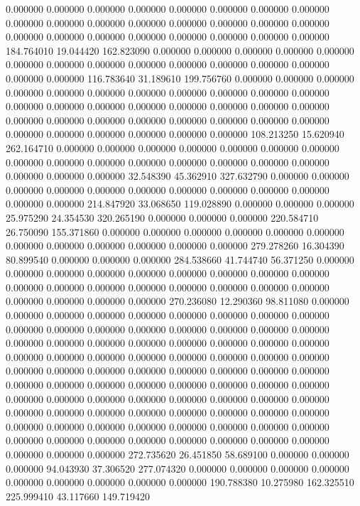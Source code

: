0.000000 0.000000 0.000000
0.000000 0.000000 0.000000
0.000000 0.000000 0.000000
0.000000 0.000000 0.000000
0.000000 0.000000 0.000000
0.000000 0.000000 0.000000
0.000000 0.000000 0.000000
0.000000 0.000000 0.000000
184.764010 19.044420 162.823090
0.000000 0.000000 0.000000
0.000000 0.000000 0.000000
0.000000 0.000000 0.000000
0.000000 0.000000 0.000000
0.000000 0.000000 0.000000
116.783640 31.189610 199.756760
0.000000 0.000000 0.000000
0.000000 0.000000 0.000000
0.000000 0.000000 0.000000
0.000000 0.000000 0.000000
0.000000 0.000000 0.000000
0.000000 0.000000 0.000000
0.000000 0.000000 0.000000
0.000000 0.000000 0.000000
0.000000 0.000000 0.000000
0.000000 0.000000 0.000000
0.000000 0.000000 0.000000
108.213250 15.620940 262.164710
0.000000 0.000000 0.000000
0.000000 0.000000 0.000000
0.000000 0.000000 0.000000
0.000000 0.000000 0.000000
0.000000 0.000000 0.000000
0.000000 0.000000 0.000000
32.548390 45.362910 327.632790
0.000000 0.000000 0.000000
0.000000 0.000000 0.000000
0.000000 0.000000 0.000000
0.000000 0.000000 0.000000
214.847920 33.068650 119.028890
0.000000 0.000000 0.000000
25.975290 24.354530 320.265190
0.000000 0.000000 0.000000
220.584710 26.750090 155.371860
0.000000 0.000000 0.000000
0.000000 0.000000 0.000000
0.000000 0.000000 0.000000
0.000000 0.000000 0.000000
279.278260 16.304390 80.899540
0.000000 0.000000 0.000000
284.538660 41.744740 56.371250
0.000000 0.000000 0.000000
0.000000 0.000000 0.000000
0.000000 0.000000 0.000000
0.000000 0.000000 0.000000
0.000000 0.000000 0.000000
0.000000 0.000000 0.000000
0.000000 0.000000 0.000000
270.236080 12.290360 98.811080
0.000000 0.000000 0.000000
0.000000 0.000000 0.000000
0.000000 0.000000 0.000000
0.000000 0.000000 0.000000
0.000000 0.000000 0.000000
0.000000 0.000000 0.000000
0.000000 0.000000 0.000000
0.000000 0.000000 0.000000
0.000000 0.000000 0.000000
0.000000 0.000000 0.000000
0.000000 0.000000 0.000000
0.000000 0.000000 0.000000
0.000000 0.000000 0.000000
0.000000 0.000000 0.000000
0.000000 0.000000 0.000000
0.000000 0.000000 0.000000
0.000000 0.000000 0.000000
0.000000 0.000000 0.000000
0.000000 0.000000 0.000000
0.000000 0.000000 0.000000
0.000000 0.000000 0.000000
0.000000 0.000000 0.000000
0.000000 0.000000 0.000000
0.000000 0.000000 0.000000
0.000000 0.000000 0.000000
0.000000 0.000000 0.000000
0.000000 0.000000 0.000000
0.000000 0.000000 0.000000
272.735620 26.451850 58.689100
0.000000 0.000000 0.000000
94.043930 37.306520 277.074320
0.000000 0.000000 0.000000
0.000000 0.000000 0.000000
0.000000 0.000000 0.000000
190.788380 10.275980 162.325510
225.999410 43.117660 149.719420
